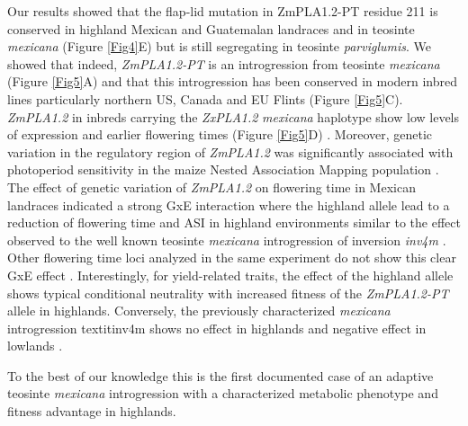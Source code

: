 \documentclass[9pt,twocolumn,twoside,lineno]{BioRxiv}
\begin{document}
Our results showed that the flap-lid mutation in ZmPLA1.2-PT residue 211 is conserved in highland Mexican and Guatemalan landraces and in teosinte \textit{mexicana} (Figure \ref{Fig4}E) but is still segregating in teosinte \textit{parviglumis}. 
We showed that indeed, \textit{ZmPLA1.2-PT} is an introgression from teosinte \textit{mexicana} (Figure \ref{Fig5}A) and that this introgression has been conserved in modern inbred lines particularly northern US, Canada and EU Flints (Figure \ref{Fig5}C). 
\textit{ZmPLA1.2} in inbreds carrying the \textit{ZxPLA1.2} \textit{mexicana} haplotype show low levels of expression and earlier flowering times (Figure \ref{Fig5}D) \cite{Kremling2018-gn}. 
Moreover, genetic variation in the regulatory region of \textit{ZmPLA1.2} was significantly associated with photoperiod sensitivity in the maize Nested Association Mapping population \cite{Hung2012-ms}. 
The effect of genetic variation of \textit{ZmPLA1.2} on flowering time in Mexican landraces indicated a strong GxE interaction where the highland allele lead to a reduction of flowering time and ASI in highland environments similar to the effect observed to the well known teosinte \textit{mexicana} introgression of inversion \textit{inv4m} \cite{Crow2020-gene}.
Other flowering time loci analyzed in the same experiment do not show this clear GxE effect \cite{Gates2019-xu}.
Interestingly, for yield-related traits, the effect of the highland allele shows typical conditional neutrality with increased fitness of the \textit{ZmPLA1.2-PT} allele in highlands. 
Conversely, the previously characterized \textit{mexicana} introgression textit{inv4m} \cite{Gonzalez-Segovia2019-jy, pyhajarvi2013, Hufford2013-gs} shows no effect in highlands and negative effect in lowlands \cite{Crow2020-gen}.


To the best of our knowledge this is the first documented case of an adaptive teosinte \textit{mexicana} introgression with a characterized metabolic phenotype and fitness advantage in highlands.
\end{document}
